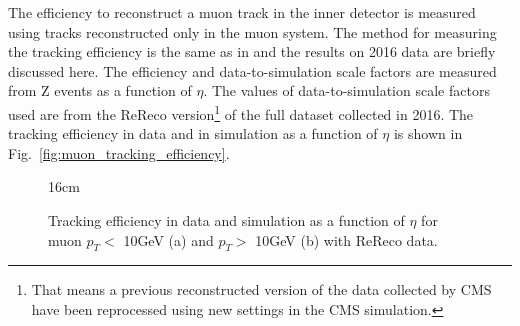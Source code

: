 The efficiency to reconstruct a muon track in the inner detector is measured using tracks reconstructed only in the muon system. The method for measuring the tracking efficiency is the same as in \cite{bib:CMS-AN-15-215} and the results on 2016 data are briefly discussed here. The efficiency and data-to-simulation scale factors are measured from Z events as a function of $\eta$. The values of data-to-simulation scale factors used are from the ReReco version\footnote{That means a previous reconstructed version of the data collected by CMS have been reprocessed using new settings in the CMS simulation.} of the full dataset collected in 2016. The tracking efficiency in data and in simulation as a function of $\eta$ is shown in Fig.~\ref{fig:muon_tracking_efficiency}.

\begin{figure}[hbtp]{16cm}
	\caption{Tracking efficiency in data and simulation as a function of $\eta$ for muon $p_{T}<$ 10GeV (a) and $p_{T}>$ 10GeV (b) with ReReco data.}
	\centering
	\quad

\end{figure}
